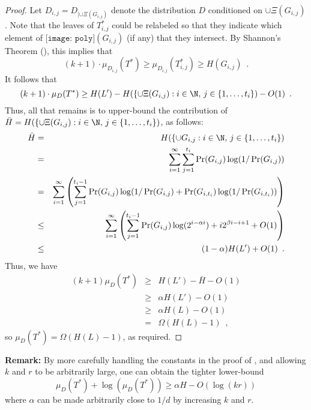 \documentclass{patmorin}
\newcommand{\poly}{\texttt{[image: poly]}}
\begin{document}
\begin{proof}
  Let $D_{i,j}=D_{|\cup\Xi(G_{i,j})}$ denote the distribution
  $D$ conditioned on $\cup\Xi(G_{i,j})$.  Note that the leaves of
  $T^*_{i,j}$ could be relabeled so that they indicate which element of
  $\poly(G_{i,j})$ (if any) that they intersect.  By Shannon's Theorem
  (), this implies that
  \[
    (k+1)\cdot\mu_{D_{i,j}}(T^*)
       \ge \mu_{D_{i,j}}(T^*_{i,j}) 
       \ge H(G_{i,j}) \enspace .
  \]
  It follows \cite[Lemma~3]{cdilm09} that
  \[
    (k+1)\cdot\mu_D(T^*) \ge H(L') 
       - H(\{\cup \Xi(G_{i,j}):i\in\N,\, j \in\{1,\ldots,t_{i}\}) 
       - O(1) \enspace .
  \]
  Thus, all that remains is to upper-bound the contribution of
  $\bar{H}=H(\{\cup \Xi(G_{i,j}):i\in\N,\, j \in\{1,\ldots,t_{i}\})$,
  as follows:
  \begin{eqnarray*}
    \bar{H} &= & H(\{\cup G_{i,j}:i\in\N,\, j \in\{1,\ldots,t_{i}\}) \\
     & = & \sum_{i=1}^\infty \sum_{j=1}^{t_{i}} 
         \Pr(G_{i,j})\log(1/\Pr(G_{i,j})) \\
   & = & \sum_{i=1}^\infty
        \left( 
          \sum_{j=1}^{t_{i}-1} 
             \Pr(G_{i,j})\log(1/\Pr(G_{i,j}) 
             + \Pr(G_{i,t_i})\log(1/\Pr(G_{i,t_i}))
        \right) \\
   & \le & \sum_{i=1}^\infty
        \left( 
          \sum_{j=1}^{t_{i}-1} 
             \Pr(G_{i,j})\log(2^{i-\alpha i})
             + i 2^{\beta i - i + 1} + O(1)
        \right) \\
    & \le & (1-\alpha)H(L') + O(1) \enspace .
  \end{eqnarray*}
  Thus, we have 
  \begin{eqnarray*}  
     (k+1)\mu_D(T^*) 
       &\ge& H(L') - \bar{H} -O(1)  \\
       &\ge& \alpha H(L') - O(1) \\
       &\ge& \alpha H(L) - O(1) \\
       & = & \Omega(H(L) - 1) \enspace ,
  \end{eqnarray*}
  so $\mu_D(T^*) = \Omega(H(L) - 1)$, as required.
\end{proof}

\noindent\textbf{Remark:}  By more carefully handling the constants
in the proof of , and allowing $k$ and $r$ to be
arbitrarily large, one can obtain the tighter lower-bound
\[
   \mu_D(T^*) + 
   \log (\mu_D(T^*)) \ge \alpha H - O(\log (kr))
\]
where $\alpha$ can be made arbitrarily close to $1/d$ by increasing $k$
and $r$.
\end{document}
